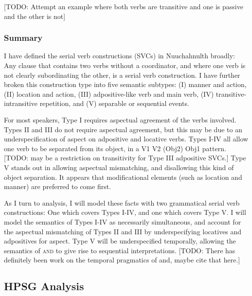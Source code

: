 [TODO: Attempt an example where both verbs are transitive and one is passive and the other is not]

\subsubsection{Summary}

I have defined the serial verb constructions (SVCs) in Nuuchahnulth broadly: Any clause that contains two verbs without a coordinator, and where one verb is not clearly subordinating the other, is a serial verb construction. I have further broken this construction type into five semantic subtypes: (I) manner and action, (II) location and action, (III) adpositive-like verb and main verb, (IV) transitive-intransitive repetition, and (V) separable or sequential events.

For most speakers, Type I requires aspectual agreement of the verbs involved. Types II and III do not require aspectual agreement, but this may be due to an underspecification of aspect on adpositive and locative verbs. Types I-IV all allow one verb to be separated from its object, in a V1 V2 (Obj2) Obj1 pattern. [TODO: may be a restriction on transitivity for Type III adpositive SVCs.] Type V stands out in allowing aspectual mismatching, and disallowing this kind of object separation. It appears that modificational elements (such as location and manner) are preferred to come first.

As I turn to analysis, I will model these facts with two grammatical serial verb constructions: One which covers Types I-IV, and one which covers Type V. I will model the semantics of Types I-IV as necessarily simultaneous, and account for the aspectual mismatching of Types II and III by underspecifying locatives and adpositives for aspect. Type V will be underspecified temporally, allowing the semantics of \textsc{and} to give rise to sequential interpretations. [TODO: There has definitely been work on the temporal pragmatics of and, maybe cite that here.]

\subsection{HPSG Analysis} \label{sec:sv:analysis}